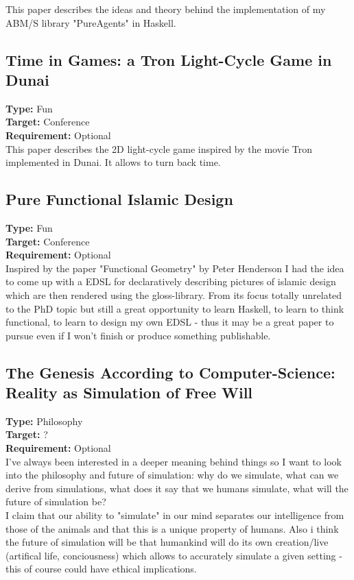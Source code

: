 This paper describes the ideas and theory behind the implementation of my ABM/S library "PureAgents" in Haskell.

\subsection{Time in Games: a Tron Light-Cycle Game in Dunai}
\textbf{Type:} Fun \\
\textbf{Target:} Conference \\
\textbf{Requirement:} Optional \\

This paper describes the 2D light-cycle game inspired by the movie Tron implemented in Dunai. It allows to turn back time.

\subsection{Pure Functional Islamic Design}
\textbf{Type:} Fun \\
\textbf{Target:} Conference \\
\textbf{Requirement:} Optional \\

Inspired by the paper "Functional Geometry" by Peter Henderson I had the idea to come up with a  EDSL for declaratively describing pictures of islamic design which are then rendered using the gloss-library. From its focus totally unrelated to the PhD topic but still a great opportunity to learn Haskell, to learn to think functional, to learn to design my own EDSL - thus it may be a great paper to pursue even if I won't finish or produce something publishable.

\subsection{The Genesis According to Computer-Science: Reality as Simulation of Free Will}
\textbf{Type:} Philosophy \\
\textbf{Target:} ? \\
\textbf{Requirement:} Optional \\

I've always been interested in a deeper meaning behind things so I want to look into the philosophy and future of simulation: why do we simulate, what can we derive from simulations, what does it say that we humans simulate, what will the future of simulation be? \\
I claim that our ability to "simulate" in our mind separates our intelligence from those of the animals and that this is a unique property of humans. Also i think the future of simulation will be that humankind will do its own creation/live (artifical life, conciousness) which allows to accurately simulate a given setting - this of course could have ethical implications.